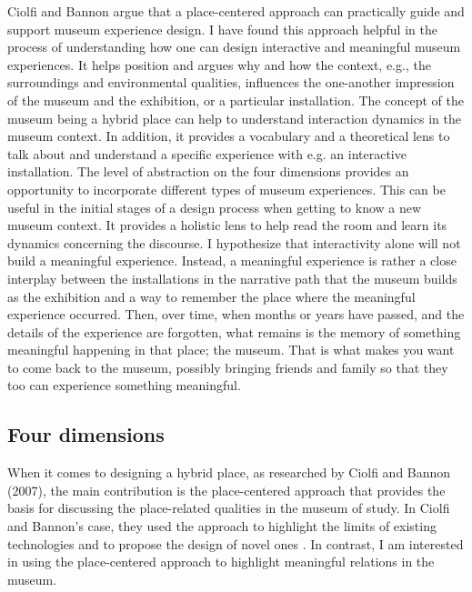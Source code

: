 Ciolfi and Bannon argue that a place-centered approach can practically guide and support museum experience design. I have found this approach helpful in the process of understanding how one can design interactive and meaningful museum experiences. It helps position and argues why and how the context, e.g., the surroundings and environmental qualities, influences the one-another impression of the museum and the exhibition, or a particular installation. The concept of the museum being a hybrid place can help to understand interaction dynamics in the museum context. In addition, it provides a vocabulary and a theoretical lens to talk about and understand a specific experience with e.g. an interactive installation. The level of abstraction on the four dimensions provides an opportunity to incorporate different types of museum experiences. This can be useful in the initial stages of a design process when getting to know a new museum context. It provides a holistic lens to help read the room and learn its dynamics concerning the discourse. I hypothesize that interactivity alone will not build a meaningful experience. Instead, a meaningful experience is rather a close interplay between the installations in the narrative path that the museum builds as the exhibition and a way to remember the place where the meaningful experience occurred. Then, over time, when months or years have passed, and the details of the experience are forgotten, what remains is the memory of something meaningful happening in that place; the museum. That is what makes you want to come back to the museum, possibly bringing friends and family so that they too can experience something meaningful.


\subsection{Four dimensions}
When it comes to designing a hybrid place, as researched by Ciolfi and Bannon (2007), the main contribution is the place-centered approach that provides the basis for discussing the place-related qualities in the museum of study. In Ciolfi and Bannon's case, they used the approach to highlight the limits of existing technologies and to propose the design of novel ones \autocite[p. 163]{hybridplace_ciolfi}. In contrast, I am interested in using the place-centered approach to highlight meaningful relations in the museum.

